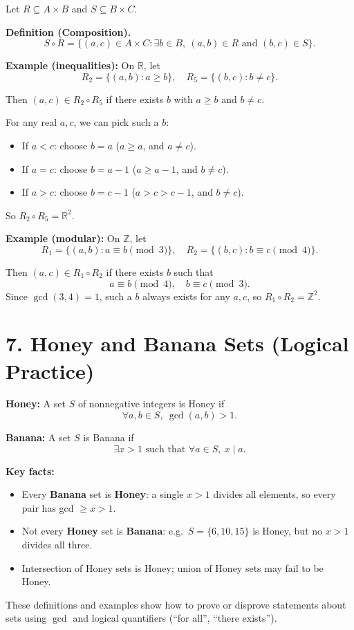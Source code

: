 \documentclass[11pt]{article}
\begin{document}
Let $R\subseteq A\times B$ and $S\subseteq B\times C$.

\textbf{Definition (Composition).}
\[
S\circ R = \{(a,c)\in A\times C: \exists b\in B,\ (a,b)\in R \text{ and } (b,c)\in S\}.
\]

\textbf{Example (inequalities):}
On $\mathbb{R}$, let
\[
R_2 = \{(a,b): a\ge b\},\quad R_5 = \{(b,c): b\neq c\}.
\]

Then $(a,c)\in R_2\circ R_5$ if there exists $b$ with $a\ge b$ and $b\neq c$.

For any real $a,c$, we can pick such a $b$:
\begin{itemize}
  \item If $a<c$: choose $b=a$ ($a\ge a$, and $a\neq c$).
  \item If $a=c$: choose $b=a-1$ ($a\ge a-1$, and $b\neq c$).
  \item If $a>c$: choose $b=c-1$ ($a>c>c-1$, and $b\neq c$).
\end{itemize}
So $R_2\circ R_5 = \mathbb{R}^2$.

\textbf{Example (modular):}
On $\mathbb{Z}$, let
\[
R_1 = \{(a,b): a\equiv b\pmod{3}\},\quad
R_2 = \{(b,c): b\equiv c\pmod{4}\}.
\]

Then $(a,c)\in R_1\circ R_2$ if there exists $b$ such that
\[
a\equiv b\pmod{4},\quad b\equiv c\pmod{3}.
\]
Since $\gcd(3,4)=1$, such a $b$ always exists for any $a,c$, so $R_1\circ R_2 = \mathbb{Z}^2$.

\section*{7. Honey and Banana Sets (Logical Practice)}

\textbf{Honey:} A set $S$ of nonnegative integers is Honey if
\[
\forall a,b\in S,\ \gcd(a,b)>1.
\]

\textbf{Banana:} A set $S$ is Banana if
\[
\exists x>1 \text{ such that } \forall a\in S,\ x\mid a.
\]

\textbf{Key facts:}
\begin{itemize}
  \item Every \textbf{Banana} set is \textbf{Honey}: a single $x>1$ divides all elements, so every pair has gcd $\ge x>1$.
  \item Not every \textbf{Honey} set is \textbf{Banana}: e.g.\ $S=\{6,10,15\}$ is Honey, but no $x>1$ divides all three.
  \item Intersection of Honey sets is Honey; union of Honey sets may fail to be Honey.
\end{itemize}

These definitions and examples show how to prove or disprove statements about sets using $\gcd$ and logical quantifiers (``for all'', ``there exists'').
\end{document}
